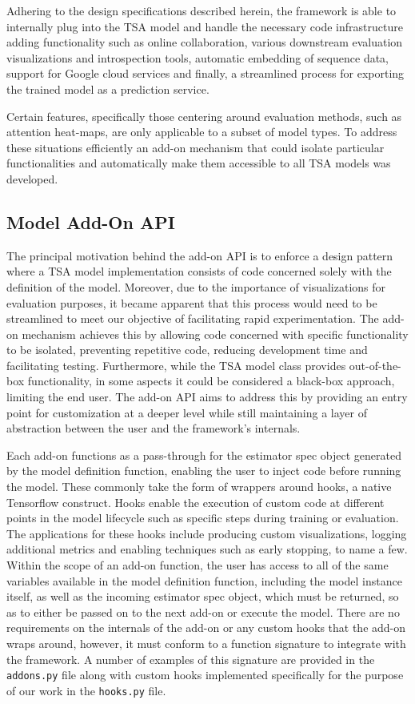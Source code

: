 \documentclass[../../fyp.tex]{subfiles}
\begin{document}
Adhering to the design specifications described herein, the framework is able to internally plug into the TSA model and handle the necessary code infrastructure adding functionality such as online collaboration, various downstream evaluation visualizations and introspection tools, automatic embedding of sequence data, support for Google cloud services and finally, a streamlined process for exporting the trained model as a prediction service. 

Certain features, specifically those centering around evaluation methods, such as attention heat-maps, are only applicable to a subset of model types. To address these situations efficiently an add-on mechanism that could isolate particular functionalities and automatically make them accessible to all TSA models was developed. 

\subsection{Model Add-On API}
The principal motivation behind the add-on API is to enforce a design pattern where a TSA model implementation consists of code concerned solely with the definition of the model. Moreover, due to the importance of visualizations for evaluation purposes, it became apparent that this process would need to be streamlined to meet our objective of facilitating rapid experimentation. The add-on mechanism achieves this by allowing code concerned with specific functionality to be isolated, preventing repetitive code, reducing development time and facilitating testing. Furthermore, while the TSA model class provides out-of-the-box functionality, in some aspects it could be considered a black-box approach, limiting the end user. The add-on API aims to address this by providing an entry point for customization at a deeper level while still maintaining a layer of abstraction between the user and the framework's internals.

Each add-on functions as a pass-through for the estimator spec object generated by the model definition function, enabling the user to inject code before running the model. These commonly take the form of wrappers around hooks, a native Tensorflow construct. Hooks enable the execution of custom code at different points in the model lifecycle such as specific steps during training or evaluation. The applications for these hooks include producing custom visualizations, logging additional metrics and enabling techniques such as early stopping, to name a few. Within the scope of an add-on function, the user has access to all of the same variables available in the model definition function, including the model instance itself, as well as the incoming estimator spec object, which must be returned, so as to either be passed on to the next add-on or execute the model. There are no requirements on the internals of the add-on or any custom hooks that the add-on wraps around, however, it must conform to a function signature to integrate with the framework. A number of examples of this signature are provided in the \texttt{addons.py} file along with custom hooks implemented specifically for the purpose of our work in the \texttt{hooks.py} file.  
\end{document}
